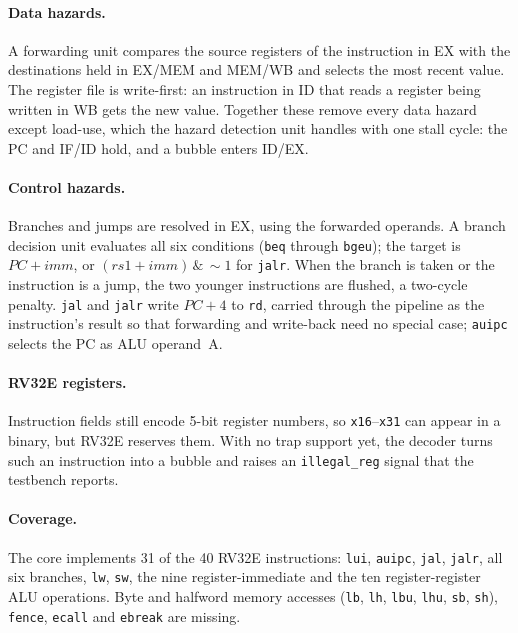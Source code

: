 \documentclass[12pt]{article}
\begin{document}
\paragraph{Data hazards.}
A forwarding unit compares the source registers of the instruction in EX with
the destinations held in EX/MEM and MEM/WB and selects the most recent value.
The register file is write-first: an instruction in ID that reads a register
being written in WB gets the new value. Together these remove every data hazard
except load-use, which the hazard detection unit handles with one stall cycle:
the PC and IF/ID hold, and a bubble enters ID/EX.

\paragraph{Control hazards.}
Branches and jumps are resolved in EX, using the forwarded operands. A branch
decision unit evaluates all six conditions (\texttt{beq} through
\texttt{bgeu}); the target is $PC + imm$, or $(rs1 + imm)\,\&\,{\sim}1$ for
\texttt{jalr}. When the branch is taken or the instruction is a jump, the two
younger instructions are flushed, a two-cycle penalty. \texttt{jal} and
\texttt{jalr} write $PC + 4$ to \texttt{rd}, carried through the pipeline as the
instruction's result so that forwarding and write-back need no special case;
\texttt{auipc} selects the PC as ALU operand~A.

\paragraph{RV32E registers.}
Instruction fields still encode 5-bit register numbers, so
\texttt{x16}--\texttt{x31} can appear in a binary, but RV32E reserves them. With
no trap support yet, the decoder turns such an instruction into a bubble and
raises an \texttt{illegal\_reg} signal that the testbench reports.

\paragraph{Coverage.}
The core implements 31 of the 40 RV32E instructions: \texttt{lui},
\texttt{auipc}, \texttt{jal}, \texttt{jalr}, all six branches, \texttt{lw},
\texttt{sw}, the nine register-immediate and the ten register-register ALU
operations. Byte and halfword memory accesses (\texttt{lb}, \texttt{lh},
\texttt{lbu}, \texttt{lhu}, \texttt{sb}, \texttt{sh}), \texttt{fence},
\texttt{ecall} and \texttt{ebreak} are missing.
\end{document}
